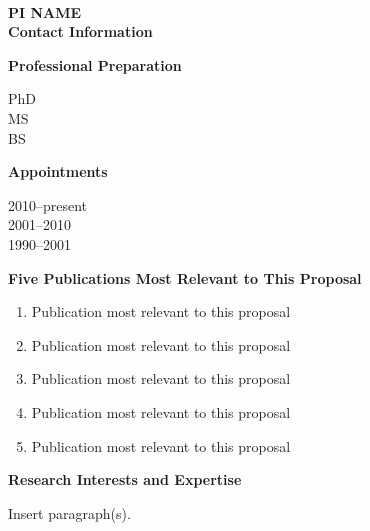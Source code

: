 \documentclass[11pt,letterpaper,english]{article}
\begin{document}
\setlength{\parindent}{0in} %

\pagestyle{fancy}   \renewcommand{%
\headrulewidth}{0.0pt}



\\
{\bf PI NAME}\\
{\bf Contact Information} \smallskip

\begin{flushleft} {\bf Professional Preparation}
{\parindent 16pt

PhD \\ 
MS \\ 
BS \\ 
}

\vspace{.04in}
{\bf Appointments}
{\parindent 16pt

2010--present \\ 
2001--2010 \\ 
1990--2001 \\ 
}

\vspace{.04in}
{\bf Five Publications Most Relevant to This Proposal}
\vspace{-6pt}
\begin{enumerate} \itemsep1pt \parskip0pt 
\item Publication most relevant to this proposal \\ 
\item Publication most relevant to this proposal \\ 
\item Publication most relevant to this proposal \\ 
\item Publication most relevant to this proposal \\ 
\item Publication most relevant to this proposal \\ 
\end{enumerate} 

\vspace{-6pt}
{\bf Research Interests and Expertise}
{\parindent 16pt

Insert paragraph(s).
}



\end{flushleft}
\end{document}
